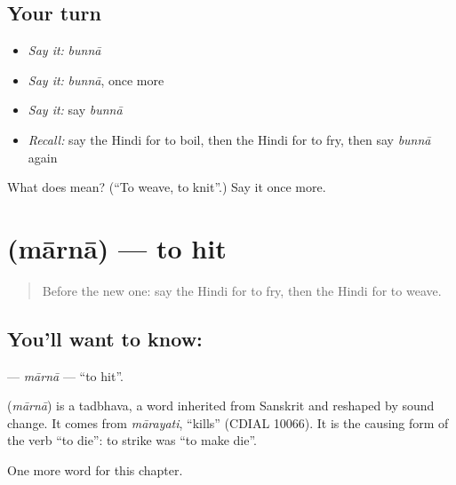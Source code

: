 \subsection*{Your turn}
\begin{itemize}
\raggedright
  \item \emph{Say it:} \emph{bunnā}
  \item \emph{Say it:} \emph{bunnā}, once more
  \item \emph{Say it:} say \emph{bunnā}
  \item \emph{Recall:} say the Hindi for to boil, then the Hindi for to fry, then say \emph{bunnā} again
\end{itemize}

\begin{tcolorbox}[breakable,colback=teal!4,colframe=teal!35!black,title={Before you move on}]
What does  mean? (\textquotedblleft{}To weave, to knit\textquotedblright{}.) Say it once more.
\end{tcolorbox}
\section[\texorpdfstring{\hi{मारना} (mārnā)}{मारना (mārnā)}]{ (mārnā) — to hit}

\label{lesson:HI-C178-maarnaa}



\begin{quote}
Before the new one: say the Hindi for to fry, then the Hindi for to weave.
\end{quote}

\subsection*{You'll want to know: }
\textbf{} — \emph{mārnā} — \textquotedblleft{}to hit\textquotedblright{}.

\begin{cousinweb}
\textbf{} (\emph{mārnā}) is a tadbhava, a word inherited from Sanskrit and reshaped by sound change. It comes from \emph{mārayati}, \textquotedblleft{}kills\textquotedblright{} (CDIAL 10066). It is the causing form of the verb \textquotedblleft{}to die\textquotedblright{}: to strike was \textquotedblleft{}to make die\textquotedblright{}.
\end{cousinweb}

\begin{grammarlens}[title={What you've built}]
One more word for this chapter.
\end{grammarlens}

